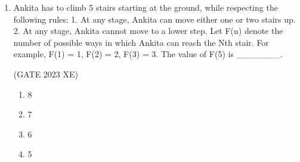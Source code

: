 \documentclass[journal,12pt,onecolumn]{IEEEtran}
\begin{document}
\begin{enumerate}
Based only on the information provided above, which one of the following 
statements can be logically inferred with certainty?

\hfill{(GATE 2023 XE)}

\begin{multicols}{2}

\begin{enumerate}

\item Some residents of the complex who are well established in their fields are also 
authors of some best-selling books.

\item All academicians residing in the complex are well established in their fields.

\item Some authors of best-selling books are residents of the complex who are well 
established in their fields.

\item Some academicians residing in the complex are well established in their fields.

\end{enumerate}

\end{multicols}

\item Ankita has to climb 5 stairs starting at the ground, while respecting the following 
rules: 
1. At any stage, Ankita can move either one or two stairs up. 
2. At any stage, Ankita cannot move to a lower step. 
Let F(n) denote the number of possible ways in which Ankita can reach the Nth  stair. For example, F(1) = 1, F(2) =  2, F(3) =  3. 
The value of F(5) is \_\_\_\_\_\_\_.

\hfill{(GATE 2023 XE)}

\begin{multicols}{4}

\begin{enumerate}

\item 8

\item 7

\item 6

\item 5

\end{enumerate}

\end{multicols}


\end{enumerate}
\end{document}
